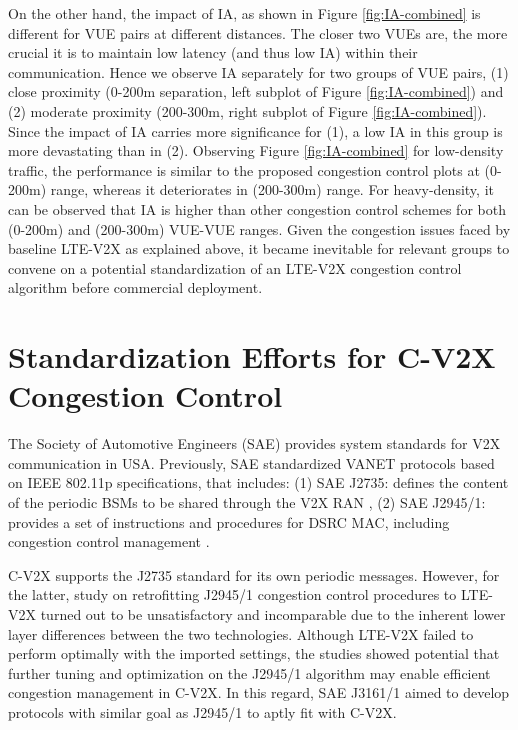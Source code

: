 \documentclass[iicol]{sn-jnl}%
\theoremstyle{thmstyleone}%
\theoremstyle{thmstyletwo}%
\theoremstyle{thmstylethree}%
\begin{document}



On the other hand, the impact of IA, as shown in Figure \mbox{\ref{fig:IA-combined}} is different for VUE pairs at different distances. The closer two VUEs are, the more crucial it is to maintain low latency (and thus low IA) within their communication. Hence we observe IA separately for two groups of VUE pairs, (1) close proximity (0-200m separation, left subplot of Figure \mbox{\ref{fig:IA-combined}}) and (2) moderate proximity (200-300m, right subplot of Figure \mbox{\ref{fig:IA-combined}}). Since the impact of IA carries more significance for (1), a low IA in this group is more devastating than in (2).
Observing Figure \mbox{\ref{fig:IA-combined}} for low-density traffic, the performance is similar to the proposed congestion control plots at (0-200m) range, whereas it deteriorates in (200-300m) range. For heavy-density, it can be observed that IA is higher than other congestion control schemes for both (0-200m) and (200-300m) VUE-VUE ranges. Given the congestion issues faced by baseline LTE-V2X as explained above, it became inevitable for relevant groups to convene on a potential standardization of an LTE-V2X congestion control algorithm before commercial deployment.



\section{Standardization Efforts for C-V2X Congestion Control}\label{sec4}
The Society of Automotive Engineers (SAE) provides system standards for V2X communication in USA.  Previously, SAE standardized VANET protocols based on IEEE 802.11p specifications, that includes: (1) SAE J2735: defines the content of the periodic BSMs to be shared through the V2X RAN \cite{saej2735}, (2) SAE J2945/1: provides a set of instructions and procedures for DSRC MAC, including congestion control management \cite{saej2945}. 



C-V2X supports the J2735 standard for its own periodic messages. However, for the latter, study on retrofitting J2945/1 congestion control procedures to LTE-V2X \cite{toghi2018multiple} turned out to be unsatisfactory and incomparable due to the inherent lower layer differences between the two technologies. Although LTE-V2X failed to perform optimally with the imported settings, the studies showed potential that further tuning and optimization on the J2945/1 algorithm may enable efficient congestion management in C-V2X. In this regard, SAE J3161/1 \cite{saej3161} aimed to develop protocols with similar goal as J2945/1 to aptly fit with C-V2X.
\end{document}

